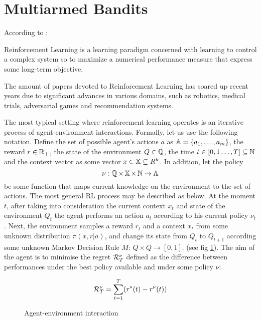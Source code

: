 
\section{Multiarmed Bandits}
According to \cite{Szepesvari2010}: 

\begin{definition}Reinforcement Learning is a learning paradigm concerned with learning to control a complex system so to maximize a numerical performance measure that express some long-term objective.    
\end{definition}

 The amount of papers devoted to Reinforcement Learning has soared up recent years due to significant advances in various domains, such as robotics, medical trials, adversarial games and recommendation systems.

 The most typical setting where reinforcement learning operates is an iterative process of agent-environment interactions. Formally, let us use the following notation. Define the set of possible agent's actions $a$ as $\operatorname{\mathbb{A}} = \{a_1, \dots, a_m \}$, the reward $r \in \operatorname{\mathbb{R}}_{+}$, the state of the environment $Q \in \operatorname{\mathbb{Q}}$, the time $t \in [0, 1 \dots, T] \subseteq \operatorname{\mathbb{N}}$ and the context vector as some vector $x \in \operatorname{\mathbb{X}} \subseteq R^k$. In addition, let the policy $$\nu:\operatorname{\mathbb{Q}} \times \operatorname{\mathbb{X}} \times \operatorname{\mathbb{N}} \to \operatorname{\mathbb{A}}$$ be some function that maps current knowledge on the environment to the set of actions. The most general RL process may be described as below. At the moment $t$, after taking into consideration the current context $x_t$ and state of the environment $Q_t$ the agent performs an action $a_t$ according to his current policy $\nu_t$. Next, the environment samples a reward $r_t$ and a context $x_t$ from some unknown distribution $\pi(x,r|a)$, and change its state from $Q_t$ to $Q_{t+1}$ according some unknown Markov Decision Rule $M:\, Q \times Q \to [0, 1]$. (see fig \ref{fig:MAB_scheme}). The aim of the agent is to minimise the regret ${\cal R}^\nu_T$ defined as the difference between performances under the best policy available and under some policy $\nu$:
 
$$
        {\cal R}^\nu_T = \sum_{t=1}^T(r^*(t) - r^{\nu}(t))
$$
 
\begin{figure}
    \centering
    \label{fig:MAB_scheme}
    \caption{Agent-environment interaction}
\end{figure}
 
